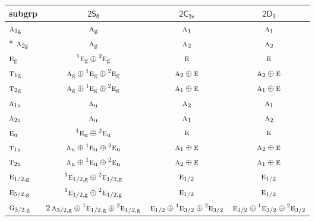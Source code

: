 \documentclass[10pt,a4paper]{article}
\numberwithin{equation}{section}
\newcommand{\grp}[1]{\mathsf{#1}}
\newcommand{\irr}[1]{\text{\normalfont\scshape #1}}
\newcommand{\conjpair}[1]{{}^{#1}}
\newcommand{\ptag}[1]{\mathrm{#1}}
\begin{document}
{\small\begin{longtable}{@{}lccc@{}}\toprule
subgrp & \href{2S6.pdf}{$\grp{2S_{6}}$} & \href{2C3v.pdf}{$\grp{2C_{3v}}$} & \href{2D3.pdf}{$\grp{2D_{3}}$}\\\midrule\endhead
\bottomrule\endfoot\endlastfoot
$\irr{a}_{1\ptag{g}}$ & $\irr{a}_{\ptag{g}}$ & $\irr{a}_{1}$ & $\irr{a}_{1}$\\*
$\irr{a}_{2\ptag{g}}$ & $\irr{a}_{\ptag{g}}$ & $\irr{a}_{2}$ & $\irr{a}_{2}$\\
$\irr{e}_{\ptag{g}}$ & $\conjpair{1}\irr{e}_{\ptag{g}}\oplus \conjpair{2}\irr{e}_{\ptag{g}}$ & $\irr{e}$ & $\irr{e}$\\
$\irr{t}_{1\ptag{g}}$ & $\irr{a}_{\ptag{g}}\oplus \conjpair{1}\irr{e}_{\ptag{g}}\oplus \conjpair{2}\irr{e}_{\ptag{g}}$ & $\irr{a}_{2}\oplus \irr{e}$ & $\irr{a}_{2}\oplus \irr{e}$\\
$\irr{t}_{2\ptag{g}}$ & $\irr{a}_{\ptag{g}}\oplus \conjpair{1}\irr{e}_{\ptag{g}}\oplus \conjpair{2}\irr{e}_{\ptag{g}}$ & $\irr{a}_{1}\oplus \irr{e}$ & $\irr{a}_{1}\oplus \irr{e}$\\
$\irr{a}_{1\ptag{u}}$ & $\irr{a}_{\ptag{u}}$ & $\irr{a}_{2}$ & $\irr{a}_{1}$\\
$\irr{a}_{2\ptag{u}}$ & $\irr{a}_{\ptag{u}}$ & $\irr{a}_{1}$ & $\irr{a}_{2}$\\
$\irr{e}_{\ptag{u}}$ & $\conjpair{1}\irr{e}_{\ptag{u}}\oplus \conjpair{2}\irr{e}_{\ptag{u}}$ & $\irr{e}$ & $\irr{e}$\\
$\irr{t}_{1\ptag{u}}$ & $\irr{a}_{\ptag{u}}\oplus \conjpair{1}\irr{e}_{\ptag{u}}\oplus \conjpair{2}\irr{e}_{\ptag{u}}$ & $\irr{a}_{1}\oplus \irr{e}$ & $\irr{a}_{2}\oplus \irr{e}$\\
$\irr{t}_{2\ptag{u}}$ & $\irr{a}_{\ptag{u}}\oplus \conjpair{1}\irr{e}_{\ptag{u}}\oplus \conjpair{2}\irr{e}_{\ptag{u}}$ & $\irr{a}_{2}\oplus \irr{e}$ & $\irr{a}_{1}\oplus \irr{e}$\\
$\irr{e}_{1/2,\ptag{g}}$ & $\conjpair{1}\irr{e}_{1/2,\ptag{g}}\oplus \conjpair{2}\irr{e}_{1/2,\ptag{g}}$ & $\irr{e}_{1/2}$ & $\irr{e}_{1/2}$\\
$\irr{e}_{5/2,\ptag{g}}$ & $\conjpair{1}\irr{e}_{1/2,\ptag{g}}\oplus \conjpair{2}\irr{e}_{1/2,\ptag{g}}$ & $\irr{e}_{1/2}$ & $\irr{e}_{1/2}$\\
$\irr{g}_{3/2,\ptag{g}}$ & $2\,\irr{a}_{3/2,\ptag{g}}\oplus \conjpair{1}\irr{e}_{1/2,\ptag{g}}\oplus \conjpair{2}\irr{e}_{1/2,\ptag{g}}$ & $\irr{e}_{1/2}\oplus \conjpair{1}\irr{e}_{3/2}\oplus \conjpair{2}\irr{e}_{3/2}$ & $\irr{e}_{1/2}\oplus \conjpair{1}\irr{e}_{3/2}\oplus \conjpair{2}\irr{e}_{3/2}$\\

\end{longtable}}
\end{document}
